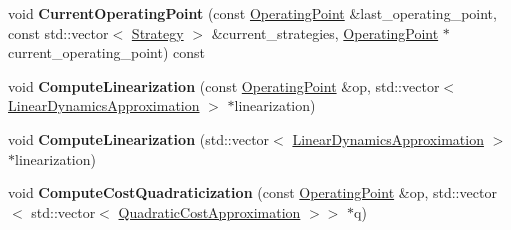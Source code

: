 \begin{DoxyCompactItemize}
\item 
void {\bfseries Current\+Operating\+Point} (const \hyperlink{structilqgames_1_1_operating_point}{Operating\+Point} \&last\+\_\+operating\+\_\+point, const std\+::vector$<$ \hyperlink{structilqgames_1_1_strategy}{Strategy} $>$ \&current\+\_\+strategies, \hyperlink{structilqgames_1_1_operating_point}{Operating\+Point} $\ast$current\+\_\+operating\+\_\+point) const \hypertarget{classilqgames_1_1_i_l_q_solver_ae0145c002de655fd2b012d2142cacb6a}{}\label{classilqgames_1_1_i_l_q_solver_ae0145c002de655fd2b012d2142cacb6a}

\item 
void {\bfseries Compute\+Linearization} (const \hyperlink{structilqgames_1_1_operating_point}{Operating\+Point} \&op, std\+::vector$<$ \hyperlink{structilqgames_1_1_linear_dynamics_approximation}{Linear\+Dynamics\+Approximation} $>$ $\ast$linearization)\hypertarget{classilqgames_1_1_i_l_q_solver_a36c9160e4d5503b5160d04c0acd842d5}{}\label{classilqgames_1_1_i_l_q_solver_a36c9160e4d5503b5160d04c0acd842d5}

\item 
void {\bfseries Compute\+Linearization} (std\+::vector$<$ \hyperlink{structilqgames_1_1_linear_dynamics_approximation}{Linear\+Dynamics\+Approximation} $>$ $\ast$linearization)\hypertarget{classilqgames_1_1_i_l_q_solver_a28112eeff11ad20d5e5ead00bb61d80c}{}\label{classilqgames_1_1_i_l_q_solver_a28112eeff11ad20d5e5ead00bb61d80c}

\item 
void {\bfseries Compute\+Cost\+Quadraticization} (const \hyperlink{structilqgames_1_1_operating_point}{Operating\+Point} \&op, std\+::vector$<$ std\+::vector$<$ \hyperlink{structilqgames_1_1_quadratic_cost_approximation}{Quadratic\+Cost\+Approximation} $>$$>$ $\ast$q)\hypertarget{classilqgames_1_1_i_l_q_solver_a54d6c9c2afc1164cbcbc6b2eec7d2086}{}\label{classilqgames_1_1_i_l_q_solver_a54d6c9c2afc1164cbcbc6b2eec7d2086}

\end{DoxyCompactItemize}
